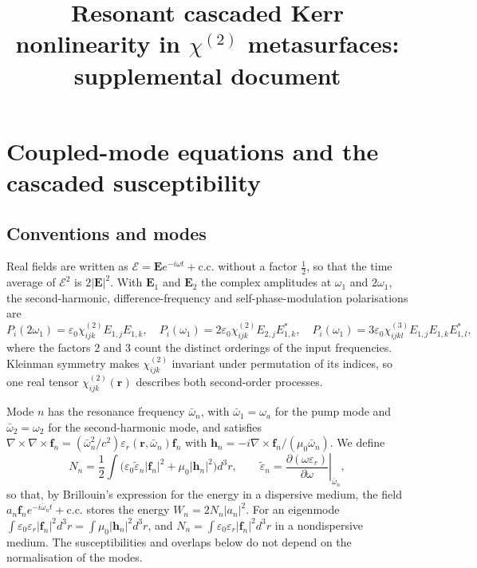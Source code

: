 \documentclass[9pt]{osa-supplemental-document}
\title{Resonant cascaded Kerr nonlinearity in $\chi^{(2)}$ metasurfaces: supplemental document}
\author{}
\newcommand{\chitwo}{\chi^{(2)}}
\newcommand{\chithree}{\chi^{(3)}}
\newcommand{\f}{\mathbf f}
\newcommand{\h}{\mathbf h}
\begin{document}
\maketitle

\section{Coupled-mode equations and the cascaded susceptibility}

\subsection{Conventions and modes}

Real fields are written as $\mathcal E=\mathbf E e^{-i\omega t}+\mathrm{c.c.}$
without a factor $\tfrac12$, so that the time average of $\mathcal E^2$ is
$2|\mathbf E|^2$.  With $\mathbf E_1$ and $\mathbf E_2$ the complex amplitudes
at $\omega_1$ and $2\omega_1$, the second-harmonic, difference-frequency and
self-phase-modulation polarisations are~\cite{boyd2020}
\begin{equation}
  P_i(2\omega_1)=\varepsilon_0\chitwo_{ijk}E_{1,j}E_{1,k},\quad
  P_i(\omega_1)=2\varepsilon_0\chitwo_{ijk}E_{2,j}E^*_{1,k},\quad
  P_i(\omega_1)=3\varepsilon_0\chithree_{ijkl}E_{1,j}E_{1,k}E^*_{1,l},
  \label{eq:pol}
\end{equation}
where the factors 2 and 3 count the distinct orderings of the input
frequencies.  Kleinman symmetry makes $\chitwo_{ijk}$ invariant under
permutation of its indices, so one real tensor $\chitwo_{ijk}(\mathbf r)$
describes both second-order processes.

Mode $n$ has the resonance frequency $\bar\omega_n$, with
$\bar\omega_1=\omega_a$ for the pump mode and $\bar\omega_2=\omega_2$ for
the second-harmonic mode, and satisfies
$\nabla\times\nabla\times\f_n=(\bar\omega_n^2/c^2)\varepsilon_r(\mathbf r,\bar\omega_n)\f_n$
with $\h_n=-i\nabla\times\f_n/(\mu_0\bar\omega_n)$.  We define
\begin{equation}
  N_n=\frac12\int\bigl(\varepsilon_0\tilde\varepsilon_n|\f_n|^2+\mu_0|\h_n|^2\bigr)d^3r,
  \qquad
  \tilde\varepsilon_n=\left.\frac{\partial(\omega\varepsilon_r)}{\partial\omega}\right|_{\bar\omega_n},
  \label{eq:Nn}
\end{equation}
so that, by Brillouin's expression for the energy in a dispersive medium,
the field $a_n\f_ne^{-i\bar\omega_nt}+\mathrm{c.c.}$ stores the energy
$W_n=2N_n|a_n|^2$.  For an eigenmode
$\int\varepsilon_0\varepsilon_r|\f_n|^2d^3r=\int\mu_0|\h_n|^2d^3r$, and
$N_n=\int\varepsilon_0\varepsilon_r|\f_n|^2d^3r$ in a nondispersive
medium.  The susceptibilities and overlaps below do not depend on the
normalisation of the modes.
\end{document}
